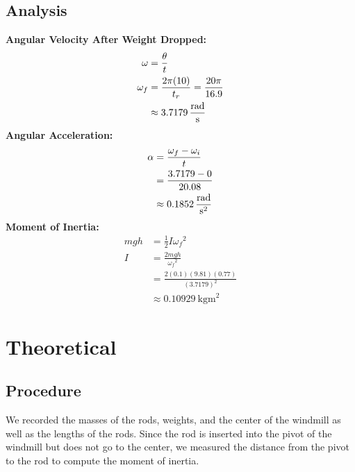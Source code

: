 \documentclass[article, 11pt]{article}
\begin{document}
    \subsection{Analysis}
    \textbf{Angular Velocity After Weight Dropped:}
    \begin{align*}
        \omega   &= \frac{\theta}{t}  \\
        \omega_f &= \frac{2\pi(10)}{t_r} = \frac{20\pi}{16.9} \\
                 &\approx \SI{3.7179}{\frac{\radian}{\second}}
    \end{align*}
    \textbf{Angular Acceleration:}
    \begin{align*}
        \alpha &= \frac{\omega_f - \omega_i}{t} \\
               &= \frac{3.7179 - 0}{20.08} \\
               &\approx \SI{0.1852}{\frac{\radian}{\second^2}}
    \end{align*}
    \textbf{Moment of Inertia:}
    \begin{align*}
        mgh &= \frac{1}{2}I{\omega_f}^2 \\
        I   &= \frac{2mgh}{{\omega_f}^2} \\
            &= \frac{2(0.1)(9.81)(0.77)}{(3.7179)^2} \\
            &\approx \SI{0.10929}{\kilogram\meter^2}
    \end{align*}

    \section{Theoretical}
    \subsection{Procedure}
    \noindent
    We recorded the masses of the rods, weights, and the center of the windmill as well as the lengths of the rods. Since the rod is inserted into the pivot of the windmill but does not go to the center, we measured the distance from the pivot to the rod to compute the moment of inertia. 
\end{document}
